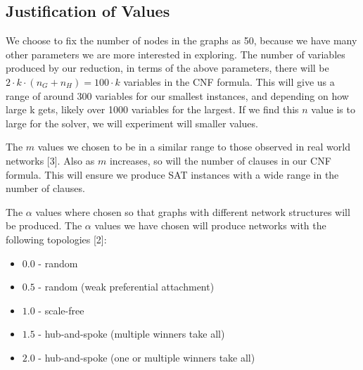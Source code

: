 \documentclass{article}
\begin{document}
\subsection{Justification of Values}

We choose to fix the number of nodes in the graphs as 50, because we have many other parameters we are more interested in exploring. The number of variables produced by our reduction, in terms of the above parameters, there will be  $ 2 \cdot k \cdot (n_G + n_H) = 100 \cdot k$ variables in the CNF formula. This will give us a range of around 300 variables for our smallest instances, and depending on how large k gets, likely over 1000 variables for the largest. If we find this $n$ value is to large for the solver, we will experiment will smaller values. 

The $m$ values we chosen to be in a similar range to those observed in real world networks [3]. Also as $m$ increases, so will the number of clauses in our CNF formula. This will ensure we produce SAT instances with a wide range in the number of clauses. 

The $\alpha $ values where chosen so that graphs with different network structures will be produced. The $\alpha$ values we have chosen will produce networks with the following topologies [2]:
\begin{itemize}
  \item $0.0$ - random
  \item $0.5$ - random (weak preferential attachment)
  \item $1.0$ - scale-free
  \item $1.5$ - hub-and-spoke (multiple winners take all)
  \item $2.0$ - hub-and-spoke (one or multiple winners take all)
\end{itemize}


\end{document}
